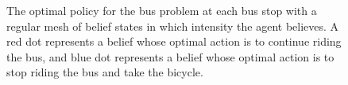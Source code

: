\documentclass{article}
\begin{document}
\begin{figure}
{
}
\caption{The optimal policy for the bus problem at each bus stop with a regular mesh of belief states in which intensity the agent believes. A red dot represents a belief whose optimal action is to continue riding the bus, and blue dot represents a belief whose optimal action is to stop riding the bus and take the bicycle.}
\end{figure}
\end{document}

